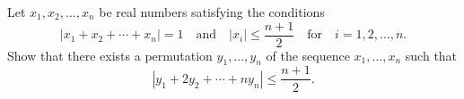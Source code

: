 Let $x_1, x_2, \ldots, x_n$ be real numbers satisfying the conditions \[ |x_1 + x_2 + \cdots + x_n| = 1 \quad \text{and} \quad |x_i| \leq \frac{n+1}{2} \quad \text{for} \quad i = 1, 2, \ldots, n. \] Show that there exists a permutation $y_1, \ldots, y_n$ of the sequence $x_1, \ldots, x_n$ such that \[ |y_1 + 2y_2 + \cdots + ny_n| \leq \frac{n+1}{2}. \]
